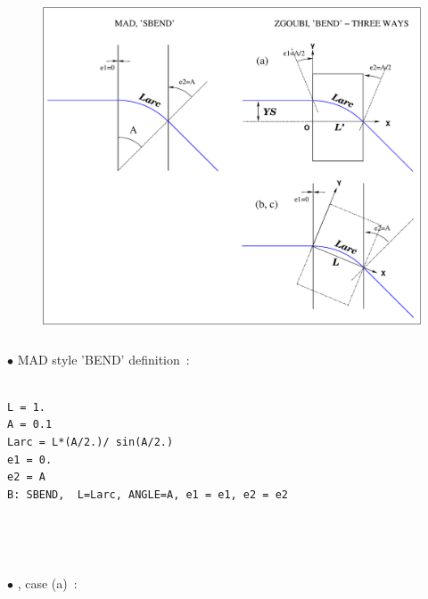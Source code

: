{\vspace{-.0ex}

\begin{figure}[h]
  \centerline{\includegraphics[height=10cm]{FigBEND_e1Zro.eps}}
  {\setlength{\captionwidth}{13cm}
	 }
\end{figure}


\begin{minipage}{.49\linewidth}

$\bullet$ MAD style 'BEND' definition~: 

\begin{minipage}{.49\linewidth}
\scriptsize
\begin{verbatim}

L = 1.
A = 0.1   
Larc = L*(A/2.)/ sin(A/2.)
e1 = 0.
e2 = A
B: SBEND,  L=Larc, ANGLE=A, e1 = e1, e2 = e2
\end{verbatim}
\end{minipage} 

~

~

$\bullet$ \zgou, case (a)~: 

\begin{minipage}{.49\linewidth}
\scriptsize
\begin{verbatim}


\end{verbatim}
\end{minipage}
\end{minipage}}
